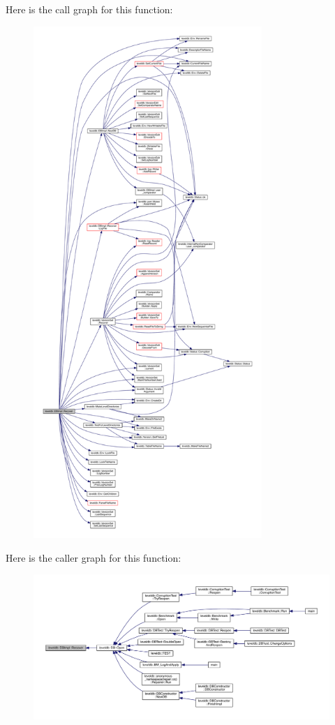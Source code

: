 Here is the call graph for this function\+:\nopagebreak
\begin{figure}[H]
\begin{center}
\leavevmode
\includegraphics[height=550pt]{classleveldb_1_1_d_b_impl_aba537e56669df2c19fc439fd9f4227d5_cgraph}
\end{center}
\end{figure}




Here is the caller graph for this function\+:
\nopagebreak
\begin{figure}[H]
\begin{center}
\leavevmode
\includegraphics[width=350pt]{classleveldb_1_1_d_b_impl_aba537e56669df2c19fc439fd9f4227d5_icgraph}
\end{center}
\end{figure}


